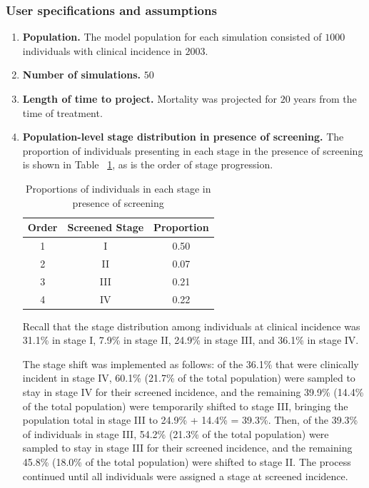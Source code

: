 \documentclass[11pt]{article}
\begin{document}
\subsubsection{User specifications and assumptions}

\begin{enumerate}
    \item \textbf{Population.} The model population for each simulation consisted of $1000$ individuals with clinical incidence in $2003$.

    \item \textbf{Number of simulations.} $50$ 

    \item \textbf{Length of time to project.} Mortality was projected for $20$ years from the time of treatment.

    \item \textbf{Population-level stage distribution in presence of screening.} The proportion of individuals presenting in each stage in the presence of screening is shown in Table ~\ref{tab:scrdist}, as is the order of stage progression. 


\begin{table}[!ht]
\centering
\begin{tabular}{ccc}
  \hline
Order & Screened Stage & Proportion \\ 
  \hline
  1 & I & 0.50 \\ 
    2 & II & 0.07 \\ 
    3 & III & 0.21 \\ 
    4 & IV & 0.22 \\ 
   \hline
\end{tabular}
\caption{Proportions of individuals in each stage in presence of screening} 
\label{tab:scrdist}
\end{table}
    Recall that the stage distribution among individuals at clinical incidence was 31.1\% in stage I, 7.9\% in stage II, 24.9\% in stage III, and 36.1\% in stage IV. 

    The stage shift was implemented as follows: of the 36.1\% that were clinically incident in stage IV, 60.1\% (21.7\% of the total population) were sampled to stay in stage IV for their screened incidence, and the remaining 39.9\% (14.4\% of the total population) were temporarily shifted to stage III, bringing the population total in stage III to 24.9\% + 14.4\% = 39.3\%.
    Then, of the 39.3\% of individuals in stage III, 54.2\% (21.3\% of the total population) were sampled to stay in stage III for their screened incidence, and the remaining 45.8\% (18.0\% of the total population) were shifted to stage II.
    The process continued until all individuals were assigned a stage at screened incidence.


\end{enumerate}
\end{document}
